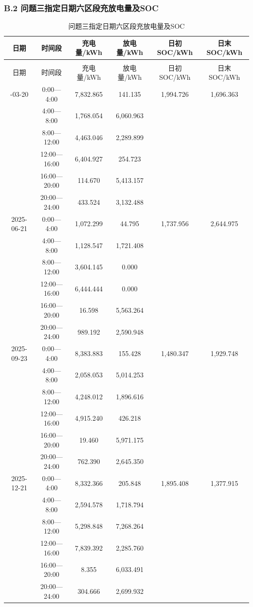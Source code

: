 \documentclass[zihao=-4,a4paper,UTF8,fontset=none]{ctexart}
\begin{document}
\endgroup

\par\pagebreak[2]\subsubsection*{B.2 问题三指定日期六区段充放电量及SOC}

\begingroup\renewcommand{\tablename}{附表}\renewcommand{\thetable}{B-2}

\begin{longtable}[]{@{}cccccc@{}}
\caption{问题三指定日期六区段充放电量及SOC}\label{tab:appendix-B-2}\tabularnewline
\toprule\noalign{}
日期 & 时间段 & 充电量/kWh & 放电量/kWh & 日初SOC/kWh & 日末SOC/kWh \\
\midrule\noalign{}
\endfirsthead
\multicolumn{6}{c}{\small 续附表B-2 问题三指定日期六区段充放电量及SOC}\\
\toprule\noalign{}
日期 & 时间段 & 充电量/kWh & 放电量/kWh & 日初SOC/kWh & 日末SOC/kWh \\
\midrule\noalign{}
\endhead
\bottomrule\noalign{}
\endlastfoot
2025-03-20 & 0:00---4:00 & 7,832.865 & 141.135 & 1,994.726 & 1,696.363 \\
& 4:00---8:00 & 1,768.054 & 6,060.963 & & \\
& 8:00---12:00 & 4,463.046 & 2,289.899 & & \\
& 12:00---16:00 & 6,404.927 & 254.723 & & \\
& 16:00---20:00 & 114.670 & 5,413.157 & & \\
& 20:00---24:00 & 433.524 & 3,132.488 & & \\
2025-06-21 & 0:00---4:00 & 1,072.299 & 44.795 & 1,737.956 & 2,644.975 \\
& 4:00---8:00 & 1,128.547 & 1,721.408 & & \\
& 8:00---12:00 & 3,604.145 & 0.000 & & \\
& 12:00---16:00 & 6,444.444 & 0.000 & & \\
& 16:00---20:00 & 16.598 & 5,563.264 & & \\
& 20:00---24:00 & 989.192 & 2,590.948 & & \\
2025-09-23 & 0:00---4:00 & 8,383.883 & 155.428 & 1,480.347 & 1,929.748 \\
& 4:00---8:00 & 2,058.053 & 5,014.253 & & \\
& 8:00---12:00 & 4,248.012 & 1,896.616 & & \\
& 12:00---16:00 & 4,915.240 & 426.218 & & \\
& 16:00---20:00 & 19.460 & 5,971.175 & & \\
& 20:00---24:00 & 762.390 & 2,645.350 & & \\
2025-12-21 & 0:00---4:00 & 8,332.366 & 205.848 & 1,895.408 & 1,377.915 \\
& 4:00---8:00 & 2,594.578 & 1,718.794 & & \\
& 8:00---12:00 & 5,298.848 & 7,268.264 & & \\
& 12:00---16:00 & 7,839.392 & 2,285.760 & & \\
& 16:00---20:00 & 8.355 & 6,033.491 & & \\
& 20:00---24:00 & 304.666 & 2,699.932 & & \\
\end{longtable}
\end{document}

